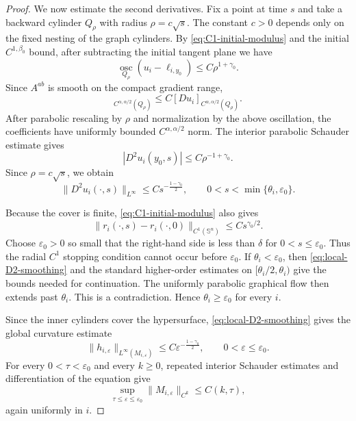 \documentclass[11pt,reqno]{amsart}
\theoremstyle{definition}
\theoremstyle{remark}
\numberwithin{equation}{section}
\begin{document}
\begin{proof}
We now estimate the second derivatives. Fix a point at time $s$ and take a backward cylinder $Q_\rho$ with radius $\rho=c\sqrt{s}$. The constant $c>0$ depends only on the fixed nesting of the graph cylinders. By \eqref{eq:C1-initial-modulus} and the initial $C^{1,\beta_0}$ bound, after subtracting the initial tangent plane we have
\begin{equation*}
 \operatorname*{osc}_{Q_\rho}(u_i-\ell_{i,y_0})\leq C\rho^{1+\gamma_0}.
\end{equation*}
Since $A^{ab}$ is smooth on the compact gradient range,
\begin{equation*}
 [A^{ab}(Du_i)]_{C^{\alpha,\alpha/2}(Q_\rho)}
 \leq C[Du_i]_{C^{\alpha,\alpha/2}(Q_\rho)}.
\end{equation*}
After parabolic rescaling by $\rho$ and normalization by the above oscillation, the coefficients have uniformly bounded $C^{\alpha,\alpha/2}$ norm. The interior parabolic Schauder estimate \cite[Theorem~4.9]{Lie96} gives
\begin{equation*}
 |D^2u_i(y_0,s)|\leq C\rho^{-1+\gamma_0}.
\end{equation*}
Since $\rho=c\sqrt{s}$, we obtain
\begin{equation}
\label{eq:local-D2-smoothing}
 \|D^2u_i(\cdot,s)\|_{L^\infty}
 \leq C s^{-\frac{1-\gamma_0}{2}},
 \qquad 0<s<\min\{\theta_i,\varepsilon_0\}.
\end{equation}

Because the cover is finite, \eqref{eq:C1-initial-modulus} also gives
\begin{equation*}
 \|r_i(\cdot,s)-r_i(\cdot,0)\|_{C^1(\mathbb S^n)}
 \leq C s^{\gamma_0/2}.
\end{equation*}
Choose $\varepsilon_0>0$ so small that the right-hand side is less than $\delta$ for $0<s\leq\varepsilon_0$. Thus the radial $C^1$ stopping condition cannot occur before $\varepsilon_0$. If $\theta_i<\varepsilon_0$, then \eqref{eq:local-D2-smoothing} and the standard higher-order estimates on $[\theta_i/2,\theta_i)$ give the bounds needed for continuation. The uniformly parabolic graphical flow then extends past $\theta_i$. This is a contradiction. Hence $\theta_i\geq\varepsilon_0$ for every $i$.

Since the inner cylinders cover the hypersurface, \eqref{eq:local-D2-smoothing} gives the global curvature estimate
\begin{equation}
\label{eq:curvature-smoothing}
 \|h_{i,\varepsilon}\|_{L^\infty(M_{i,\varepsilon})}
 \leq C\varepsilon^{-\frac{1-\gamma_0}{2}},
 \qquad 0<\varepsilon\leq\varepsilon_0.
\end{equation}
For every $0<\tau<\varepsilon_0$ and every $k\geq0$, repeated interior Schauder estimates \cite[Theorem~4.9]{Lie96} and differentiation of the equation give
\begin{equation}
\label{eq:AMCF-higher-uniform}
 \sup_{\tau\leq\varepsilon\leq\varepsilon_0}
 \|M_{i,\varepsilon}\|_{C^k}\leq C(k,\tau),
\end{equation}
again uniformly in $i$.


\end{proof}
\end{document}

